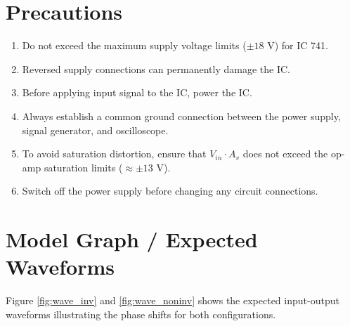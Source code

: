 \section{Precautions}
\begin{enumerate}
	\item Do not exceed the maximum supply voltage limits ($\pm 18\text{ V}$) for IC 741.
	\item Reversed supply connections can permanently damage the IC.
	\item Before applying input signal to the IC, power the IC.
	\item Always establish a common ground connection between the power supply, signal generator, and oscilloscope.
	\item To avoid saturation distortion, ensure that $V_{in} \cdot A_v$ does not exceed the op-amp saturation limits ($\approx \pm 13\text{ V}$).
	\item Switch off the power supply before changing any circuit connections.
\end{enumerate}

\section{Model Graph / Expected Waveforms}
Figure \ref{fig:wave_inv} and \ref{fig:wave_noninv}  shows the expected input-output waveforms illustrating the phase shifts for both configurations. %

%			
%			

